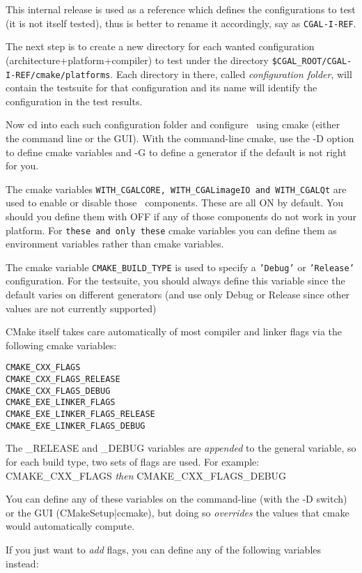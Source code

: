 This internal release is used as a reference
which defines the configurations to test (it is not itself tested), 
thus is better to rename it accordingly, say as {\tt CGAL-I-REF}.

The next step is to create a new directory for each wanted configuration 
(architecture+platform+compiler)
to test under the directory {\tt \$CGAL\_ROOT/CGAL-I-REF/cmake/platforms}.
Each directory in there, called {\em configuration folder}, will contain the testsuite 
for that configuration and its name will identify the configuration 
in the test results.

Now cd into each such configuration folder and configure \cgal\ using cmake
(either the command line or the GUI). With the command-line cmake,
use the -D option to define cmake variables and -G
to define a generator if the default is not right for you.


The cmake variables {\tt WITH\_CGALCORE, WITH\_CGALimageIO and WITH\_CGALQt}
are used to enable or disable those \cgal\ components. These are all ON by default.
You should you define them with OFF if any of those components do not work in your platform. 
For {\tt these and only these} cmake variables you can define them as environment variables
rather than cmake variables.

The cmake variable {\tt CMAKE\_BUILD\_TYPE} is used to specify a {\tt 'Debug'} or {\tt 'Release'}
configuration. For the testsuite, you should always define this variable
since the default varies on different generators (and use only Debug or Release
since other values are not currently supported)

CMake itself takes care automatically of most compiler and linker flags
via the following cmake variables:

\begin{verbatim}
CMAKE_CXX_FLAGS
CMAKE_CXX_FLAGS_RELEASE
CMAKE_CXX_FLAGS_DEBUG
CMAKE_EXE_LINKER_FLAGS
CMAKE_EXE_LINKER_FLAGS_RELEASE
CMAKE_EXE_LINKER_FLAGS_DEBUG
\end{verbatim}

The \_RELEASE and \_DEBUG variables are {\em appended} to the general variable, so for each
build type, two sets of flags are used. For example: CMAKE\_CXX\_FLAGS {\em then} CMAKE\_CXX\_FLAGS\_DEBUG 

You can define any of these variables on the command-line (with the -D switch) or the GUI (CMakeSetup|ccmake),
but doing so {\em overrides} the values that cmake would automatically compute.

If you just want to {\em add} flags, you can define any of the following variables instead:

